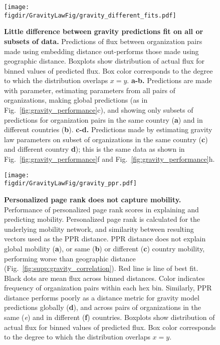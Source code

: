 \documentclass[12pt]{article} %
\def\figdir{../Figs}
\begin{document}
%
%
\begin{figure}[p!]
	\centering
	\texttt{[image: \\figdir/GravityLawFig/gravity\_different\_fits.pdf]}
	\caption{
		\textbf{Little difference between gravity predictions fit on all or subsets of data.}
		Predictions of flux between organization pairs made using embedding distance out-performs those made using geographic distance. 
		Boxplots show distribution of actual flux for binned values of predicted flux.
		Box color corresponds to the degree to which the distribution overlaps $x = y$.
		\textbf{a-b.} Predictions are made with parameter, estimating parameters from all pairs of organizations, making global predictions (as in Fig.~\ref{fig:gravity_performance}c), and showing only subsets of predictions for organization pairs in the same country (\textbf{a}) and in different countries (\textbf{b}).
		\textbf{c-d.} Predictions made by estimating gravity law parameters on subset of organizations in the same country (\textbf{c}) and different country \textbf{d}); 
		this is the same data as shown in Fig.~\ref{fig:gravity_performance}f and Fig.~\ref{fig:gravity_performance}h. 
	}
	\label{fig:supp:gravity_prediction_subsets}
\end{figure}



%
%
\begin{figure}[p!]
	\centering
	\texttt{[image: \\figdir/GravityLawFig/gravity\_ppr.pdf]}
	\caption{
		\textbf{Personalized page rank does not capture mobility.}
		Performance of personalized page rank scores in explaining and predicting mobility.
		Personalized page rank is calculated for the underlying mobility network, and similarity between resulting vectors used as the PPR distance.
		PPR distance does not explain global mobility (\textbf{a}), or same (\textbf{b}) or different (\textbf{c}) country mobility, performing worse than geographic distance (Fig.~\ref{fig:supp:gravity_correlation}). 
		Red line is line of best fit. 
		Black dots are mean flux across binned distances.
		Color indicates frequency of organization pairs within each hex bin.
		Similarly, PPR distance performs poorly as a distance metric for gravity model predictions globally (\textbf{d}), and across pairs of organizations in the same (\textit{e}) and in different (\textbf{f}) countries. 
		Boxplots show distribution of actual flux for binned values of predicted flux.
		Box color corresponds to the degree to which the distribution overlaps $x = y$.
	}
	\label{fig:supp:gravity_ppr}
\end{figure}
\end{document}

